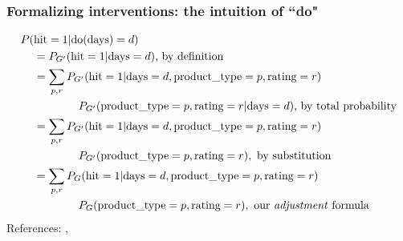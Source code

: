 \begin{frame}
\frametitle{Formalizing interventions: the intuition of ``do"}
    \vspace{-1.5cm}
    \vspace{-2.5cm}
    \begin{align*}
        P(&\textrm{hit}=1 | \mathrm{do}(\textrm{days})=d) \\
        & = P_{G'}(\textrm{hit}=1 | \textrm{days}=d) \textrm{, by definition} \\
        & = \sum_{p, r} P_{G'}(\textrm{hit}=1 | \textrm{days}=d, \textrm{product\_type} = p, \textrm{rating} = r) \\
        & \qquad  \qquad P_{G'}(\textrm{product\_type} = p, \textrm{rating} = r | \textrm{days}=d)\textrm{, by total probability} \\
        & = \sum_{p, r} P_{G'}(\textrm{hit}=1 | \textrm{days}=d, \textrm{product\_type} = p, \textrm{rating} = r) \\
        & \qquad  \qquad P_{G'}(\textrm{product\_type} = p, \textrm{rating} = r), \textrm{ by substitution} \\
        & =  \sum_{p, r} P_{G}(\textrm{hit}=1 | \textrm{days}=d, \textrm{product\_type} = p, \textrm{rating} = r) \\
        & \qquad  \qquad P_{G}(\textrm{product\_type} = p, \textrm{rating} = r), \textrm{ our \emph{adjustment} formula}
    \end{align*}
    References: \cite{pearl2016causal}, \cite{chmp}
\end{frame}

